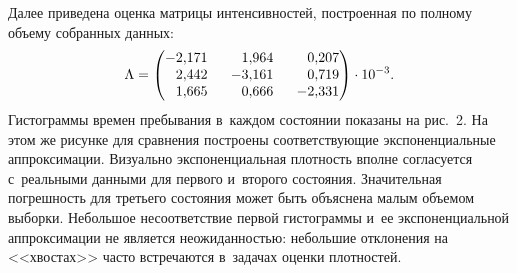 \begin{multicols}{2}
Далее приведена оценка матрицы интенсивностей, построенная по
полному объему собранных данных:
\begin{gather*}
\Lambda = \begin{pmatrix}
-2{,}171\ &\ \hphantom{-}1{,}964\ &\ \hphantom{-}0{,}207\\
\hphantom{-}2{,}442\ &\ -3{,}161\ &\ \hphantom{-}0{,}719\\
\hphantom{-}1{,}665\ &\ \hphantom{-}0{,}666\ &\ -2{,}331\\
              \end{pmatrix} \cdot 10^{-3}.
\end{gather*}
Гистограммы времен пребывания в~каждом состоянии показаны на
рис.~2. На этом же рисунке для
сравнения построены соответствующие экспоненциальные аппроксимации.
Визуально экспоненциальная плотность вполне согласуется с~реальными
данными для первого и~второго состояния. Значительная погрешность
для третьего состояния может быть объяснена малым объемом выборки.
Небольшое несоответствие первой гистограммы и~ее экспоненциальной
аппроксимации не является неожиданностью: небольшие отклонения на
<<хвос\-тах>> часто встречаются в~задачах оценки плотностей.


 \begin{figure*} %
\vspace*{1pt}
\begin{center}
\mbox{%
 \epsfxsize=147.9mm
 }
\end{center} 
\vspace*{-12.1pt}
\vspace*{1pt}
 \begin{center}
 \mbox{%
 \epsfxsize=145.918mm
 }
 \end{center}
 \vspace*{-12.1pt}
 \label{pic:3_hists}
\vspace*{-0.15036pt}
\end{figure*}


\end{multicols}
